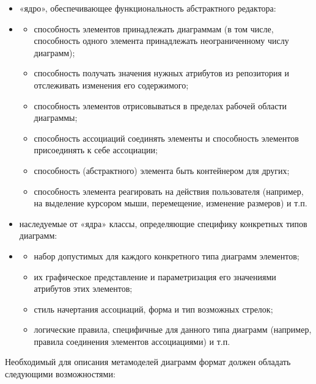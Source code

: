 \documentclass[a4paper]{article}
\newcommand\liststyleWWviiiNumxii{%
\renewcommand\theenumi{\arabic{enumi}}
\renewcommand\theenumii{\arabic{enumii}}
\renewcommand\theenumiii{\arabic{enumiii}}
\renewcommand\labelitemi{[F0B7?]}
\renewcommand\labelenumi{\theenumi.}
\renewcommand\labelenumii{\theenumii.}
\renewcommand\labelenumiii{\theenumiii.}
}
\newcommand\liststyleWWviiiNumviii{%
\renewcommand\labelitemi{o}
\renewcommand\labelitemii{o}
\renewcommand\labelitemiii{[F0A7?]}
\renewcommand\labelitemiv{[F0B7?]}
}
\newcommand\liststyleWWviiiNumii{%
\renewcommand\theenumi{\arabic{enumi}}
\renewcommand\theenumii{\arabic{enumii}}
\renewcommand\theenumiii{\arabic{enumiii}}
\renewcommand\labelitemi{[F0B7?]}
\renewcommand\labelenumi{\theenumi.}
\renewcommand\labelenumii{\theenumii.}
\renewcommand\labelenumiii{\theenumiii.}
}
\begin{document}
\liststyleWWviiiNumxii
\begin{itemize}
\item {
«ядро», обеспечивающее функциональность абстрактного редактора: }
\end{itemize}
\liststyleWWviiiNumviii
\begin{itemize}
\item \begin{itemize}
\item {
способность элементов принадлежать диаграммам (в том числе, способность
одного элемента принадлежать неограниченному числу диаграмм); }
\item {
способность получать значения нужных атрибутов из репозитория и
отслеживать изменения его содержимого;}
\item {
способность элементов отрисовываться в пределах рабочей области
диаграммы;}
\item {
способность ассоциаций соединять элементы и способность элементов
присоединять к себе ассоциации;}
\item {
способность (абстрактного) элемента быть контейнером для других;}
\item {
способность элемента реагировать на действия пользователя (например, на
выделение курсором мыши, перемещение, изменение размеров) и т.п.}
\end{itemize}
\end{itemize}
\liststyleWWviiiNumii
\begin{itemize}
\item {
наследуемые от «ядра» классы, определяющие специфику конкретных типов
диаграмм: }
\end{itemize}
\liststyleWWviiiNumviii
\begin{itemize}
\item \begin{itemize}
\item {
набор допустимых для каждого конкретного типа диаграмм элементов; }
\item {
их графическое представление и параметризация его значениями атрибутов
этих элементов;}
\item {
стиль начертания ассоциаций, форма и тип возможных стрелок;}
\item {
логические правила, специфичные для данного типа диаграмм (например,
правила соединения элементов ассоциациями) и т.п.}
\end{itemize}
\end{itemize}
{
Необходимый для описания метамоделей диаграмм формат должен обладать
следующими возможностями:}
\end{document}
